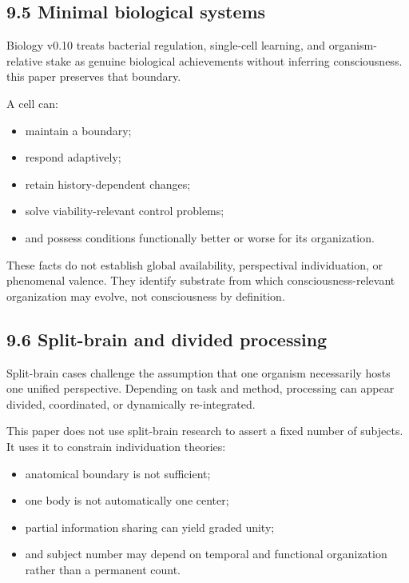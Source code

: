 \documentclass[
  11pt,
]{article}
\providecommand{\tightlist}{%
  \setlength{\itemsep}{0pt}\setlength{\parskip}{0pt}}
\begin{document}
\subsection{9.5 Minimal biological
systems}\label{minimal-biological-systems}

Biology v0.10 treats bacterial regulation, single-cell learning, and
organism-relative stake as genuine biological achievements without
inferring consciousness. this paper preserves that boundary.

A cell can:

\begin{itemize}
\tightlist
\item
  maintain a boundary;
\item
  respond adaptively;
\item
  retain history-dependent changes;
\item
  solve viability-relevant control problems;
\item
  and possess conditions functionally better or worse for its
  organization.
\end{itemize}

These facts do not establish global availability, perspectival
individuation, or phenomenal valence. They identify substrate from which
consciousness-relevant organization may evolve, not consciousness by
definition.

\subsection{9.6 Split-brain and divided
processing}\label{split-brain-and-divided-processing}

Split-brain cases challenge the assumption that one organism necessarily
hosts one unified perspective. Depending on task and method, processing
can appear divided, coordinated, or dynamically re-integrated.

This paper does not use split-brain research to assert a fixed number of
subjects. It uses it to constrain individuation theories:

\begin{itemize}
\tightlist
\item
  anatomical boundary is not sufficient;
\item
  one body is not automatically one center;
\item
  partial information sharing can yield graded unity;
\item
  and subject number may depend on temporal and functional organization
  rather than a permanent count.
\end{itemize}
\end{document}
